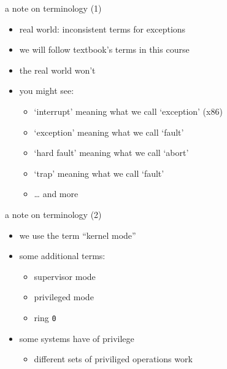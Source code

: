 \begin{frame}{a note on terminology (1)}
\begin{itemize}
\item real world: inconsistent terms for exceptions
\item we will follow textbook's terms in this course
\vspace{.5cm}
\item the real world won't
\item you might see:
    \begin{itemize}
    \item `interrupt' meaning what we call `exception' (x86)
    \item `exception' meaning what we call `fault'
    \item `hard fault' meaning what we call `abort'
    \item `trap' meaning what we call `fault'
    \item \ldots{} and more
    \end{itemize}
\end{itemize}
\end{frame}

\begin{frame}{a note on terminology (2)}
\begin{itemize}
\item we use the term ``kernel mode''
\vspace{.5cm}
\item some additional terms:
    \begin{itemize}
    \item supervisor mode
    \item privileged mode
    \item ring {\tt 0}
    \end{itemize}
\item some systems have  of privilege
    \begin{itemize}
    \item different sets of priviliged operations work
    \end{itemize}
\end{itemize}
\end{frame}
